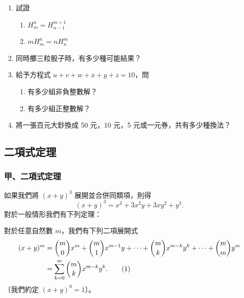 \begin{enumerate}[label=\textbf{\arabic*.}]
  \item[*8.] 試證
  \begin{enumerate}[label=(\arabic*)]
    \item $H_m^n = H_{n-1}^{m+1}$
    \item $m H_m^n = n H_n^m$
  \end{enumerate}
  \item 同時擲三粒骰子時，有多少種可能結果？
  \item[*10.] 給予方程式 $u + v + w + x + y + z = 10$，問
  \begin{enumerate}[label=(\arabic*)]
    \item 有多少組非負整數解？
    \item 有多少組正整數解？
  \end{enumerate}
  \item 將一張百元大鈔換成 50 元，10 元，5 元或一元券，共有多少種換法？
\end{enumerate}


\subsection{二項式定理}\label{sec:b5-2-4}

\subsubsection*{甲、二項式定理}\label{subsec:b5-2-4-a}

如果我們將 $(x + y)^3$ 展開並合併同類項，則得
\[ (x + y)^3 = x^3 + 3x^2 y + 3xy^2 + y^3. \]
對於一般情形我們有下列定理：

\medskip
\begin{theorem}[二項式定理]\label{thm:b5-2-10}
對於任意自然數 $m$，我們有下列二項展開式
\begin{align}
(x + y)^m &= \binom{m}{0} x^m + \binom{m}{1} x^{m-1} y + \dotsb + \binom{m}{k} x^{m-k} y^k + \dotsb + \binom{m}{m} y^m \notag \\
&= \sum_{k=0}^m \binom{m}{k} x^{m-k} y^k. \label{eq:b5-2-4-1}\tag{1}
\end{align}
〔我們約定 $(x + y)^0 = 1$〕。
\end{theorem}
